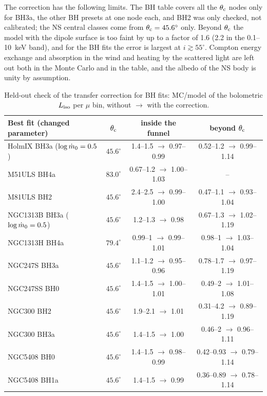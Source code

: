 The correction has the following limits.
The BH table covers all the $\theta_{\rm c}$ nodes only for BH3a, the other BH presets at one node each, and BH2 was only checked, not calibrated; the NS central classes come from $\theta_{\rm c} = 45.6^\circ$ only.
Beyond $\theta_{\rm c}$ the model with the dipole surface is too faint by up to a factor of 1.6 (2.2 in the 0.1--10~keV band), and for the BH fits the error is largest at $i \gtrsim 55^\circ$.
Compton energy exchange and absorption in the wind and heating by the scattered light are left out both in the Monte Carlo and in the table, and the albedo of the NS body is unity by assumption.

\begin{table}
\centering
\caption{Held-out check of the transfer correction for BH fits: MC/model of the bolometric $L_{\rm iso}$ per $\mu$ bin, without $\to$ with the correction.}
\label{tab:mc_heldout_bh}
\small
\begin{tabular}{@{}lccc@{}}
\toprule
Best fit (changed parameter) & $\theta_{\rm c}$ & inside the funnel & beyond $\theta_{\rm c}$ \\
\midrule
HolmIX BH3a ($\log\dot m_0 = 0.5$) & $45.6^\circ$ & 1.4--1.5 $\to$ 0.97--0.99 & 0.52--1.2 $\to$ 0.99--1.14 \\
M51ULS BH4a & $83.0^\circ$ & 0.67--1.2 $\to$ 1.00--1.03 & -- \\
M81ULS BH2 & $45.6^\circ$ & 2.4--2.5 $\to$ 0.99--1.00 & 0.47--1.1 $\to$ 0.93--1.04 \\
NGC1313B BH3a ($\log\dot m_0 = 0.5$) & $45.6^\circ$ & 1.2--1.3 $\to$ 0.98 & 0.67--1.3 $\to$ 1.02--1.19 \\
NGC1313H BH4a & $79.4^\circ$ & 0.99--1 $\to$ 0.99--1.01 & 0.98--1 $\to$ 1.03--1.04 \\
NGC247S BH3a & $45.6^\circ$ & 1.1--1.2 $\to$ 0.95--0.96 & 0.78--1.7 $\to$ 0.97--1.19 \\
NGC247SS BH0 & $45.6^\circ$ & 1.4--1.5 $\to$ 1.00--1.01 & 0.49--2 $\to$ 1.01--1.08 \\
NGC300 BH2 & $45.6^\circ$ & 1.9--2.1 $\to$ 1.01 & 0.31--4.2 $\to$ 0.89--1.19 \\
NGC300 BH3a & $45.6^\circ$ & 1.4--1.5 $\to$ 1.00 & 0.46--2 $\to$ 0.96--1.11 \\
NGC5408 BH0 & $45.6^\circ$ & 1.4--1.5 $\to$ 0.98--0.99 & 0.42--0.93 $\to$ 0.79--1.14 \\
NGC5408 BH1a & $45.6^\circ$ & 1.4--1.5 $\to$ 0.99 & 0.36--0.89 $\to$ 0.78--1.14 \\

\end{tabular}
\end{table}
